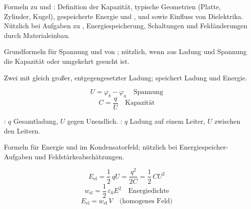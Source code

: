 

\begin{runintext}
Formeln zu  und : Definition der Kapazität, typische Geometrien (Platte, Zylinder, Kugel), gespeicherte Energie und ,  und  sowie Einfluss von Dielektrika. Nützlich bei Aufgaben zu , Energiespeicherung, Schaltungen und Feldänderungen durch Materialeinbau.
\end{runintext}

\begin{runintext}
Grundformeln für Spannung und  von ; nützlich, wenn aus Ladung und Spannung die Kapazität oder umgekehrt gesucht ist.
\end{runintext}
\begin{defbox}[Kondensator]
Zwei  mit gleich großer, entgegengesetzter Ladung; speichert Ladung und Energie.
\end{defbox}
\begin{formulabox}
\[ U = \varphi_b - \varphi_a \quad \text{Spannung} \]
\formulasep
\[ C = \frac{q}{U} \quad \text{Kapazität} \]
\end{formulabox}
\begin{runintext}
: $q$ Gesamtladung, $U$ gegen Unendlich. : $q$ Ladung auf einem Leiter, $U$ zwischen den Leitern.
\end{runintext}


\begin{runintext}
Formeln für Energie und  im Kondensatorfeld; nützlich bei Energiespeicher-Aufgaben und Feldstärkeabschätzungen.
\end{runintext}
\begin{formulabox}
\[ E_{\mathrm{el}} = \frac{1}{2}\,qU = \frac{q^2}{2C} = \frac{1}{2}\,CU^2 \]
\formulasep
\[ w_{\mathrm{el}} = \frac{1}{2}\,\varepsilon_0 E^2 \quad \text{Energiedichte} \]
\[ E_{\mathrm{el}} = w_{\mathrm{el}}\,V \quad \text{(homogenes Feld)} \]
\end{formulabox}

